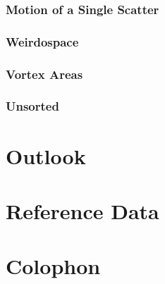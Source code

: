 \documentclass[a4paper,titlepage,onecolumn]{report}
\begin{document}
  \subsection{Motion of a Single Scatter}
  \subsection{Weirdospace}
  \subsection{Vortex Areas}
  \subsection{Unsorted}

\chapter{Outlook} \label{ch:outlook}

\chapter{Reference Data} \label{ch:reference}
\chapter{Colophon}



\end{document}

